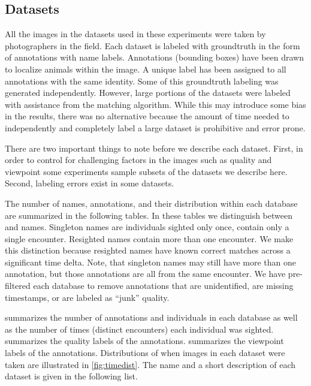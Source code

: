     \subsection{Datasets}\label{sub:datasets}

        All the images in the datasets used in these experiments were taken by photographers in the field. Each
        dataset is labeled with groundtruth in the form of annotations with name labels. Annotations (bounding
        boxes) have been drawn to localize animals within the image. A unique \name{} label has been assigned to
        all annotations with the same identity. Some of this groundtruth labeling was generated independently.
        However, large portions of the datasets were labeled with assistance from the matching algorithm. While
        this may introduce some bias in the results, there was no alternative because the amount of time needed to
        independently and completely label a large dataset is prohibitive and error prone.

        There are two important things to note before we describe each dataset. First, in order to control for
        challenging factors in the images such as quality and viewpoint some experiments sample subsets of the
        datasets we describe here. Second, labeling errors exist in some datasets.

        \DatabaseInfo{}

        \timedist{}

        The number of names, annotations, and their distribution within each database are summarized in the
        following tables. In these tables we distinguish between  and 
        names. Singleton names are individuals sighted only once, \ie{} contain only a single encounter. Resighted
        names contain more than one encounter. We make this distinction because resighted names have known correct
        matches across a significant time delta. Note, that singleton names may still have more than one
        annotation, but those annotations are all from the same encounter. We have pre-filtered each database to
        remove annotations that are unidentified, are missing timestamps, or are labeled as ``junk'' quality.

         summarizes the number of annotations and individuals in each database as
          well as the number of times (distinct encounters) each individual was sighted.
         summarizes the quality labels of the annotations.
         summarizes the viewpoint labels of the annotations.
        Distributions of when images in each dataset were taken are illustrated in \cref{fig:timedist}.
        The name and a short description of each dataset is given in the following list.

